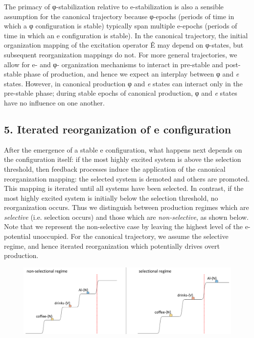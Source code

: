   The primacy of φ-stabilization relative to e-stabilization is also a sensible assumption for the canonical trajectory because φ-epochs (periods of time in which a φ configuration is stable) typically span multiple e-epochs (periods of time in which an e configuration is stable). In the canonical trajectory, the initial organization mapping of the excitation operator Ê may depend on φ-states, but subsequent reorganization mappings do not. For more general trajectories, we allow for e- and φ- organization mechanisms to interact in pre-stable and post-stable phase of production, and hence we expect an interplay between φ and \textit{e} states. However, in canonical production φ and \textit{e} states can interact only in the pre-stable phase; during stable epochs of canonical production, φ and \textit{e} states have no influence on one another. 

\subsection{5. Iterated reorganization of e configuration}

After the emergence of a stable e configuration, what happens next depends on the configuration itself: if the most highly excited system is above the selection threshold, then feedback processes induce the application of the canonical reorganization mapping: the selected system is demoted and others are promoted. This mapping is iterated until all systems have been selected. In contrast, if the most highly excited system is initially below the selection threshold, no reorganization occurs. Thus we distinguish between production regimes which are \textit{selective} (i.e. selection occurs) and those which are \textit{non-selective}, as shown below. Note that we represent the non-selective case by leaving the highest level of the e-potential unoccupied. For the canonical trajectory, we assume the selective regime, and hence iterated reorganization which potentially drives overt production. 

  
\begin{figure}
\includegraphics[width=\textwidth]{figures/Tilsen-img53.png}
\caption{\missingcaption}
\label{fig:}
\end{figure}
 

